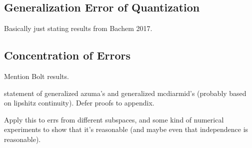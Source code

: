 
\subsection{Generalization Error of Quantization}

Basically just stating results from Bachem 2017.

\subsection{Concentration of Errors}

Mention Bolt results.

statement of generalized azuma's and generalized mcdiarmid's (probably based on lipshitz continuity). Defer proofs to appendix.

Apply this to errs from different subspaces, and some kind of numerical experiments to show that it's reasonable (and maybe even that independence is reasonable).


